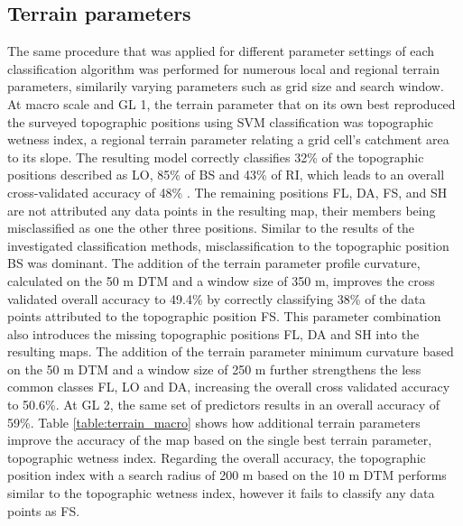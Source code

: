\documentclass[final,1p,times,twocolumn,authoryear]{elsarticle}
\begin{document}
\subsection{Terrain parameters}
The same procedure that was applied for different parameter settings of each classification algorithm was performed for  numerous local and regional terrain parameters, similarily varying parameters such as grid size and search window. At macro scale and GL 1, the terrain parameter that on its own best reproduced the surveyed topographic positions using SVM classification was topographic wetness index, a regional terrain parameter relating a grid cell's catchment area to its slope. The resulting model correctly classifies 32\% of the topographic positions described as LO, 85\% of BS and 43\% of RI, which leads to an overall cross-validated accuracy of 48\% . The remaining positions FL, DA, FS, and SH are not attributed any data points in the resulting map, their members being misclassified as one the other three positions. Similar to the results of the investigated classification methods, misclassification to the topographic position BS was dominant. The addition of the terrain parameter profile curvature, calculated on the 50 m DTM and a window size of 350 m, improves the cross validated overall accuracy to 49.4\% by correctly classifying 38\% of the data points attributed to the topographic position FS. This parameter combination also introduces the missing topographic positions FL, DA and SH into the resulting maps. The addition of the terrain parameter minimum curvature based on the 50 m DTM and a window size of 250 m further strengthens the less common classes FL, LO and DA, increasing the overall cross validated accuracy to 50.6\%. At GL 2, the same set of predictors results in an overall accuracy of 59\%. Table \ref{table:terrain_macro} shows how additional terrain parameters improve the accuracy of the map based on the single best terrain parameter, topographic wetness index. Regarding the overall accuracy, the topographic position index with a search radius of 200 m based on the 10 m DTM performs similar to the topographic wetness index, however it fails to classify any data points as FS. 
\end{document}
